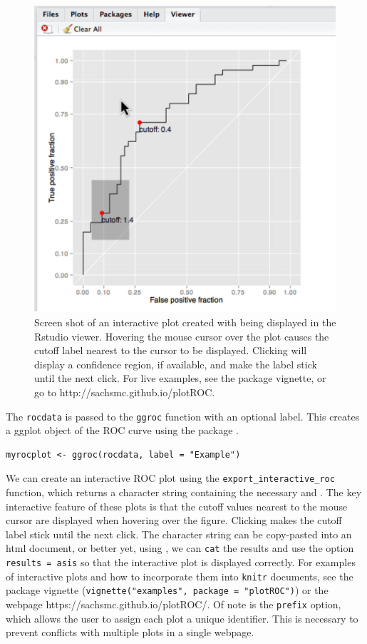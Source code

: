 \documentclass[article]{jss}
\begin{document}
\begin{figure}[ht]
\centering
\includegraphics{figure/screen-shot.pdf}
\caption{Screen shot of an interactive plot created with  being displayed in the Rstudio viewer. Hovering the mouse cursor over the plot causes the cutoff label nearest to the cursor to be displayed. Clicking will display a confidence region, if available, and make the label stick until the next click. For live examples, see the package vignette, or go to http://sachsmc.github.io/plotROC. \label{interact}}
\end{figure}

The \texttt{rocdata} is passed to the \texttt{ggroc} function with an
optional label. This creates a ggplot object of the ROC curve using the
 package \citep{ggplot2}.

\begin{verbatim}
myrocplot <- ggroc(rocdata, label = "Example")
\end{verbatim}

We can create an interactive ROC plot using the
\texttt{export\_interactive\_roc} function, which returns a character
string containing the necessary  and
. The key interactive feature of these plots is
that the cutoff values nearest to the mouse cursor are displayed when
hovering over the figure. Clicking makes the cutoff label stick until
the next click. The character string can be copy-pasted into an html
document, or better yet, using  \citep{knitr}, we can
\texttt{cat} the results and use the option
\texttt{results = \textquotesingle{}asis\textquotesingle{}} so that the
interactive plot is displayed correctly. For examples of interactive
plots and how to incorporate them into \texttt{knitr} documents, see the
package vignette (\texttt{vignette("examples", package = "plotROC")}) or
the webpage https://sachsmc.github.io/plotROC/. Of note is the
\texttt{prefix} option, which allows the user to assign each plot a
unique identifier. This is necessary to prevent conflicts with multiple
plots in a single webpage.
\end{document}
